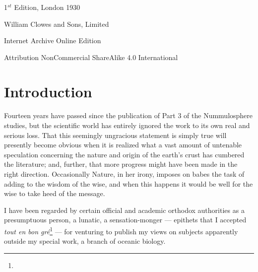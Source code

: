 \documentclass[a4paper, 12pt, oneside]{article}
\begin{document}
\begin{titlepage}
	
		
	\vspace*{\fill}%
	
	1$^{st}$ Edition, London 1930 %
	
	{\small William Clowes and Sons, Limited } %

	\vspace{1\baselineskip} %

    Internet Archive Online Edition  %
	
	{\small Attribution NonCommercial ShareAlike 4.0 International } %
\end{titlepage}
\setlength{\parskip}{1mm plus1mm minus1mm}
\setcounter{tocdepth}{3}
\setcounter{secnumdepth}{3}
\pagestyle{fancy}
\fancyhf{}
\cfoot{\Fontauri{\thepage}}
\tableofcontents
\clearpage
\listoffigures{}
\clearpage
\Large
\section*{Introduction}
\paragraph{}
Fourteen years have passed since the publication of Part 3 of the Nummulosphere studies, but the scientific world has entirely ignored the work to its own real and serious loss. That this seemingly ungracious statement is simply true will presently become obvious when it is realized what a vast amount of untenable speculation concerning the nature and origin of the earth's crust has cumbered the literature; and, further, that more progress might have been made in the right direction. Occasionally Nature, in her irony, imposes on babes the task of adding to the wisdom of the wise, and when this happens it would be well for the wise to take heed of the message.

I have been regarded by certain official and academic orthodox authorities as a presumptuous person, a lunatic, a sensation-monger --- epithets that I accepted \emph{tout en bon gré}\footnote{} --- for venturing to publish my views on subjects apparently outside my special work, a branch of oceanic biology.
\end{document}
